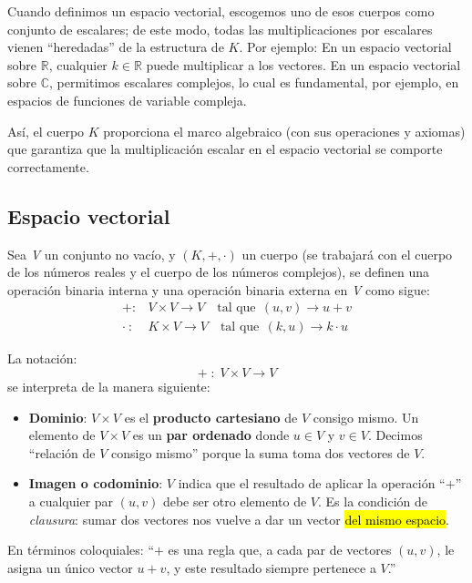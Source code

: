 Cuando definimos un espacio vectorial, escogemos uno de esos cuerpos como conjunto de escalares; de este modo, todas las multiplicaciones por escalares vienen ``heredadas'' de la estructura de \(K\). Por ejemplo: En un espacio vectorial sobre \(\mathbb{R}\), cualquier \(k\in\mathbb{R}\) puede multiplicar a los vectores. En un espacio vectorial sobre \(\mathbb{C}\), permitimos escalares complejos, lo cual es fundamental, por ejemplo, en espacios de funciones de variable compleja.

Así, el cuerpo \(K\) proporciona el marco algebraico (con sus operaciones y axiomas) que garantiza que la multiplicación escalar en el espacio vectorial se comporte correctamente.

\subsection{Espacio vectorial}

Sea \textit{V} un conjunto no vacío, y \(\left(K, +, \cdot\right)\) un cuerpo (se trabajará con el cuerpo de los números reales y el cuerpo de los números complejos), se definen una operación binaria interna y una operación binaria externa en \textit{V} como sigue:
\begin{align*}
  +:& V \times V \rightarrow V \quad \text{tal que}~~ (u,v) \rightarrow u+v \\
  \cdot ~ :& K \times V \rightarrow V \quad \text{tal que}~~ (k,u) \rightarrow k\cdot u
\end{align*}

La notación:
\[
+\;:\;V\times V\longrightarrow V
\]
se interpreta de la manera siguiente:
\begin{itemize}
  \item \textbf{Dominio}: \(
  V \times V
  \) es el \textbf{producto cartesiano} de \(V\) consigo mismo. Un elemento de \(V \times V\) es un \textbf{par ordenado} donde \(u \in V\) y \(v \in V\). Decimos ``relación de \(V\) consigo mismo'' porque la suma toma dos vectores de \(V\).
  \item \textbf{Imagen o codominio}: \(V\) indica que el resultado de aplicar la operación ``\(+\)'' a cualquier par \((u,v)\) debe ser otro elemento de \(V\). Es la condición de \textit{clausura}: sumar dos vectores nos vuelve a dar un vector \hl{del mismo espacio}.
\end{itemize}

En términos coloquiales: ``\(+\) es una regla que, a cada par de vectores \((u,v)\), le asigna un único vector \(u+v\), y este resultado siempre pertenece a \(V\).''


